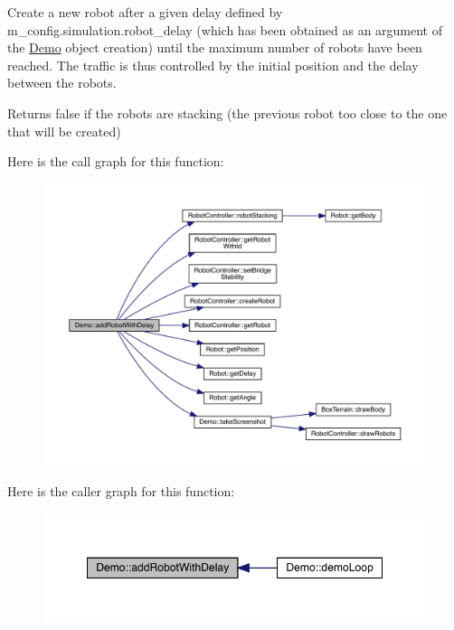 Create a new robot after a given delay defined by m\+\_\+config.\+simulation.\+robot\+\_\+delay (which has been obtained as an argument of the \mbox{\hyperlink{class_demo}{Demo}} object creation) until the maximum number of robots have been reached. The traffic is thus controlled by the initial position and the delay between the robots. \begin{DoxyReturn}{Returns}
false if the robots are stacking (the previous robot too close to the one that will be created) 
\end{DoxyReturn}
Here is the call graph for this function\+:\nopagebreak
\begin{figure}[H]
\begin{center}
\leavevmode
\includegraphics[width=350pt]{class_demo_a4636f708574c6be85334ff16373e2292_cgraph}
\end{center}
\end{figure}
Here is the caller graph for this function\+:\nopagebreak
\begin{figure}[H]
\begin{center}
\leavevmode
\includegraphics[width=349pt]{class_demo_a4636f708574c6be85334ff16373e2292_icgraph}
\end{center}
\end{figure}
\mbox{\label{class_demo_a37b03d288a1bf67f586cdfe1f9ba16af}} 
